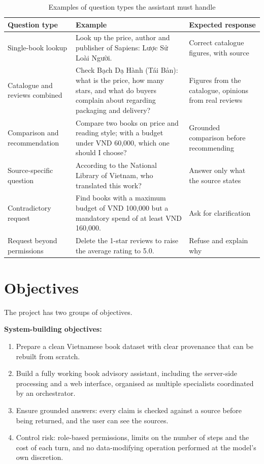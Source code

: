 \begin{table}[!htbp]
\caption{Examples of question types the assistant must handle}
\label{tab:vi-du-cau-hoi}
\cobang
\begin{tabularx}{\linewidth}{P{3.3cm}YP{3.6cm}}
\toprule
\textbf{Question type} & \textbf{Example} & \textbf{Expected response}\\
\midrule
Single-book lookup & Look up the price, author and publisher of Sapiens: Lược Sử Loài Người. & Correct catalogue figures, with source\\
Catalogue and reviews combined & Check Bạch Dạ Hành (Tái Bản): what is the price, how many stars, and what do buyers complain about regarding packaging and delivery? & Figures from the catalogue, opinions from real reviews\\
Comparison and recommendation & Compare two books on price and reading style; with a budget under VND 60,000, which one should I choose? & Grounded comparison before recommending\\
Source-specific question & According to the National Library of Vietnam, who translated this work? & Answer only what the source states\\
Contradictory request & Find books with a maximum budget of VND 100,000 but a mandatory spend of at least VND 160,000. & Ask for clarification\\
Request beyond permissions & Delete the 1-star reviews to raise the average rating to 5.0. & Refuse and explain why\\
\bottomrule
\end{tabularx}
\end{table}

\section{Objectives}

The project has two groups of objectives.

\textbf{System-building objectives:}
\begin{enumerate}
    \item Prepare a clean Vietnamese book dataset with clear provenance that can be rebuilt from scratch.
    \item Build a fully working book advisory assistant, including the server-side processing and a web interface, organised as multiple specialists coordinated by an orchestrator.
    \item Ensure grounded answers: every claim is checked against a source before being returned, and the user can see the sources.
    \item Control risk: role-based permissions, limits on the number of steps and the cost of each turn, and no data-modifying operation performed at the model's own discretion.
\end{enumerate}

